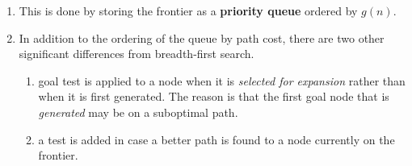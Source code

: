 \begin{enumerate}
    \item  This is done by storing the frontier as a \textbf{priority queue} ordered by $g(n)$.
    \hfill \cite{ai/book/Artificial-Intelligence-A-Modern-Approach/Russell-Norvig}

    \item In addition to the ordering of the queue by path cost, there are two other significant differences from breadth-first search.
    \hfill \cite{ai/book/Artificial-Intelligence-A-Modern-Approach/Russell-Norvig}
    \begin{enumerate}
        \item  goal test is applied to a node when it is \textit{selected for expansion} rather than when it is first generated.
        The reason is that the first goal node that is \textit{generated} may be on a suboptimal path.
        \hfill \cite{ai/book/Artificial-Intelligence-A-Modern-Approach/Russell-Norvig}

        \item a test is added in case a better path is found to a node currently on the frontier.
        \hfill \cite{ai/book/Artificial-Intelligence-A-Modern-Approach/Russell-Norvig}
    \end{enumerate}

\end{enumerate}

\vspace{0.5cm}



